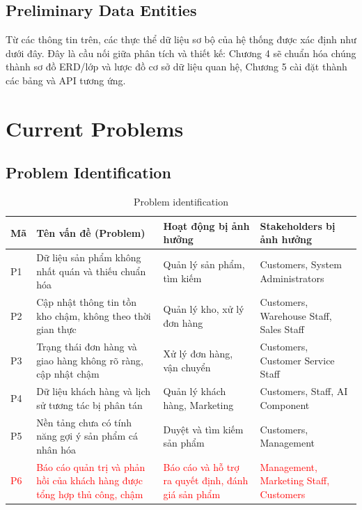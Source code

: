\documentclass[12pt,a4paper,oneside]{report}
\newif\ifmark \marktrue
\newcommand{\chg}[1]{\ifmark\textcolor{red}{#1}\else #1\fi}
\newenvironment{chgblock}{\ifmark\color{red}\fi}{}
\begin{document}
\begin{chgblock}
\subsection{Preliminary Data Entities}

Từ các thông tin trên, các thực thể dữ liệu sơ bộ của hệ thống được xác định như dưới đây. Đây là cầu nối giữa phân tích và thiết kế: Chương 4 sẽ chuẩn hóa chúng thành sơ đồ ERD/lớp và lược đồ cơ sở dữ liệu quan hệ, Chương 5 cài đặt thành các bảng và API tương ứng.

\end{chgblock}


\section{Current Problems}

\subsection{Problem Identification}

\begin{longtable}{p{1.2cm}p{5cm}p{5cm}p{4.8cm}}
\caption{Problem identification}\\
\toprule
\textbf{Mã} & \textbf{Tên vấn đề (Problem)} & \textbf{Hoạt động bị ảnh hưởng} & \textbf{Stakeholders bị ảnh hưởng} \\
\midrule
\endhead
\bottomrule
\endlastfoot
P1 & Dữ liệu sản phẩm không nhất quán và thiếu chuẩn hóa & Quản lý sản phẩm, tìm kiếm & Customers, System Administrators \\
P2 & Cập nhật thông tin tồn kho chậm, không theo thời gian thực & Quản lý kho, xử lý đơn hàng & Customers, Warehouse Staff, Sales Staff \\
P3 & Trạng thái đơn hàng và giao hàng không rõ ràng, cập nhật chậm & Xử lý đơn hàng, vận chuyển & Customers, Customer Service Staff \\
P4 & Dữ liệu khách hàng và lịch sử tương tác bị phân tán & Quản lý khách hàng, Marketing & Customers, Staff, AI Component \\
P5 & Nền tảng chưa có tính năng gợi ý sản phẩm cá nhân hóa & Duyệt và tìm kiếm sản phẩm & Customers, Management \\
\chg{P6} & \chg{Báo cáo quản trị và phản hồi của khách hàng được tổng hợp thủ công, chậm} & \chg{Báo cáo và hỗ trợ ra quyết định, đánh giá sản phẩm} & \chg{Management, Marketing Staff, Customers} \\
\end{longtable}
\end{document}
